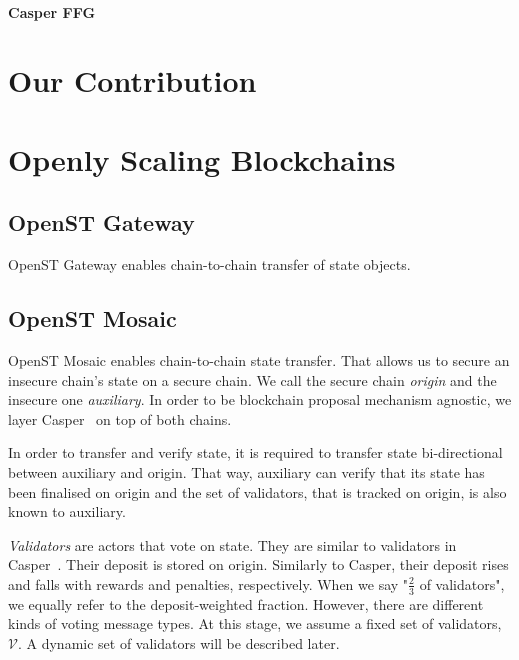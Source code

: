 \documentclass[12pt,a4paper]{article}
\newcommand{\V}{\mathcal{V}}
\begin{document}
\paragraph{Casper FFG}
\cite{casperffg}

%
%
\section{Our Contribution}

%
%
\section{Openly Scaling Blockchains}

\subsection{OpenST Gateway}
\label{subsec:gateway}

OpenST Gateway enables chain-to-chain transfer of state objects.

\subsection{OpenST Mosaic}
\label{subsec:mosaic}

OpenST Mosaic enables chain-to-chain state transfer.
That allows us to secure an insecure chain's state on a secure chain.
We call the secure chain \emph{origin} and the insecure one \emph{auxiliary}.
In order to be blockchain proposal mechanism agnostic, we layer Casper~\cite{casperffg} on top of both chains.

In order to transfer and verify state, it is required to transfer state bi-directional between auxiliary and origin.
That way, auxiliary can verify that its state has been finalised on origin and
the set of validators, that is tracked on origin, is also known to auxiliary.

\emph{Validators} are actors that vote on state.
They are similar to validators in Casper~\cite{casperffg}.
Their deposit is stored on origin.
Similarly to Casper, their deposit rises and falls with rewards and penalties, respectively.
When we say "$\frac{2}{3}$ of validators", we equally refer to the deposit-weighted fraction.
However, there are different kinds of voting message types.
At this stage, we assume a fixed set of validators, $\V$.
A dynamic set of validators will be described later.
\end{document}
